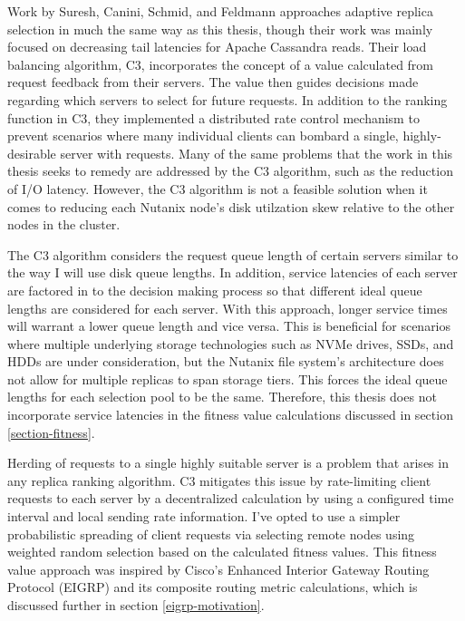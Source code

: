 \documentclass[12pt]{article}
\begin{document}
  Work by Suresh, Canini, Schmid, and Feldmann \cite{suresh2015} approaches
  adaptive replica selection in much the same way as this thesis, though their
  work was mainly focused on decreasing tail latencies for Apache Cassandra
  \cite{cassandra} reads. Their load balancing algorithm, C3, incorporates the
  concept of a value calculated from request feedback from their servers. The
  value then guides decisions made regarding which servers to select for future
  requests.  In addition to the ranking function in C3, they implemented a
  distributed rate control mechanism to prevent scenarios where many individual
  clients can bombard a single, highly-desirable server with requests. Many of
  the same problems that the work in this thesis seeks to remedy are addressed
  by the C3 algorithm, such as the reduction of I/O latency. However, the C3
  algorithm is not a feasible solution when it comes to reducing each Nutanix
  node's disk utilzation skew relative to the other nodes in the cluster.

  The C3 algorithm considers the request queue length of certain
  servers similar to the way I will use disk queue lengths. In addition,
  service latencies of each server are factored in to the decision making
  process so that different ideal queue lengths are considered for each server.
  With this approach, longer service times will warrant a lower queue length
  and vice versa. This is beneficial for scenarios where multiple
  underlying storage technologies such as NVMe drives, SSDs, and HDDs are under
  consideration, but the Nutanix file system's architecture does not allow for
  multiple replicas to span storage tiers. This forces the ideal queue lengths
  for each selection pool to be the same. Therefore, this thesis does not
  incorporate service latencies in the fitness value calculations discussed in
  section \ref{section-fitness}.

  Herding of requests to a single highly suitable server is a problem that
  arises in any replica ranking algorithm. C3 mitigates this issue by
  rate-limiting client requests to each server by a decentralized calculation
  by using a configured time interval and local sending rate information. I've
  opted to use a simpler probabilistic spreading of client requests via
  selecting remote nodes using weighted random selection based on the
  calculated fitness values.  This fitness value approach was inspired by
  Cisco's Enhanced Interior Gateway Routing Protocol (EIGRP) \cite{eigrp} and
  its composite routing metric calculations, which is discussed further in
  section \ref{eigrp-motivation}.
\end{document}
